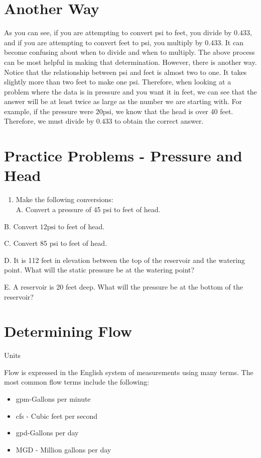 \documentclass[10pt]{article}
\begin{document}
\section{Another Way}
As you can see, if you are attempting to convert psi to feet, you divide by $0.433$, and if you are attempting to convert feet to psi, you multiply by $0.433$. It can become confusing about when to divide and when to multiply. The above process can be most helpful in making that determination. However, there is another way. Notice that the relationship between psi and feet is almost two to one. It takes slightly more than two feet to make one psi. Therefore, when looking at a problem where the data is in pressure and you want it in feet, we can see that the answer will be at least twice as large as the number we are starting with. For example, if the pressure were $20 \mathrm{psi}$, we know that the head is over 40 feet. Therefore, we must divide by $0.433$ to obtain the correct answer.

\section{Practice Problems - Pressure and Head}
\begin{enumerate}
  \item Make the following conversions:\\
A. Convert a pressure of 45 psi to feet of head.
\end{enumerate}
B. Convert $12 \mathrm{psi}$ to feet of head.

C. Convert 85 psi to feet of head.

D. It is 112 feet in elevation between the top of the reservoir and the watering point. What will the static pressure be at the watering point?

E. A reservoir is 20 feet deep. What will the pressure be at the bottom of the reservoir?

\section{Determining Flow}
Units

Flow is expressed in the English system of measurements using many terms. The most common flow terms include the following:

\begin{itemize}
  \item gpm-Gallons per minute

  \item cfs - Cubic feet per second

  \item gpd-Gallons per day

  \item MGD - Million gallons per day

\end{itemize}
\end{document}
